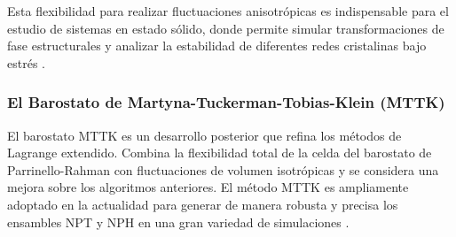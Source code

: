 Esta flexibilidad para realizar fluctuaciones anisotrópicas es indispensable para el estudio de sistemas en estado sólido, donde permite simular transformaciones de fase estructurales y analizar la estabilidad de diferentes redes cristalinas bajo estrés \cite[165]{allen2012computer}.

\subsubsection{El Barostato de Martyna-Tuckerman-Tobias-Klein (MTTK)}
El barostato MTTK es un desarrollo posterior que refina los métodos de Lagrange extendido. Combina la flexibilidad total de la celda del barostato de Parrinello-Rahman con fluctuaciones de volumen isotrópicas y se considera una mejora sobre los algoritmos anteriores. El método MTTK es ampliamente adoptado en la actualidad para generar de manera robusta y precisa los ensambles NPT y NPH en una gran variedad de simulaciones \cite[119]{zhou2022molecular}.

